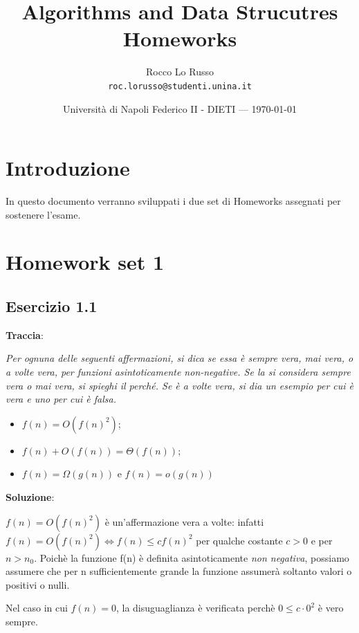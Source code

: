 \documentclass{article}
\title{Algorithms and Data Strucutres Homeworks} %
\author{Rocco Lo Russo\\ \texttt{roc.lorusso@studenti.unina.it}} %
\date{Università di Napoli Federico II - DIETI --- \today} %
\begin{document}
\maketitle %


\section*{Introduzione} %
In questo documento verranno sviluppati i due set di Homeworks assegnati per sostenere l'esame.

\section{Homework set 1} \label{sec:homework_1}%
\subsection{Esercizio 1.1} \label{subsec:esercizio1_1}
\textbf{Traccia}:

\noindent
\textit{Per ognuna delle seguenti affermazioni, si dica se essa è sempre vera, mai vera, o a volte 
vera, per funzioni asintoticamente non-negative. Se la si considera sempre vera o mai vera, 
si spieghi il perché. Se è a volte vera, si dia un esempio per cui è vera e uno per cui è falsa.}
\begin{itemize}
    \item $f(n) = O(f(n)^2)$;
    \item $f(n) + O(f(n)) =  \Theta(f(n))$;
    \item $ f(n) = \Omega(g(n))$ e $f(n) = o(g(n))$
\end{itemize}
\vspace{\baselineskip}

\noindent
\textbf{Soluzione}: 

\noindent
$f(n) = O(f(n)^2) $ è un'affermazione vera a volte: infatti $f(n) = O(f(n)^2) \iff f(n) \le cf(n)^2 $ per qualche costante $ c>0 $ e per $n > n_0$. Poichè la funzione f(n) è definita asintoticamente \textit{non negativa}, possiamo assumere che per n sufficientemente grande la funzione assumerà soltanto valori o positivi o nulli. 

\noindent
Nel caso in cui $f(n) = 0$, la disuguaglianza è verificata perchè $ 0 \le c \cdot 0^2$ è vero sempre. 
\end{document}
